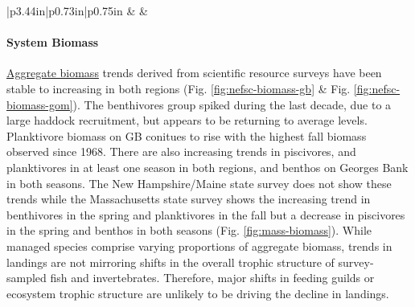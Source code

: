 \documentclass[
  10pt,
]{article}
\begin{document}
\begin{longtable}[c]{|p{3.44in}|p{0.73in}|p{0.75in}}
 &  &  \\




\end{longtable}

\hypertarget{system-biomass}{%
\paragraph{System Biomass}\label{system-biomass}}

\href{https://noaa-edab.github.io/catalog/aggregate-survey-biomass.html}{Aggregate biomass} trends derived from scientific resource surveys have been stable to increasing in both regions (Fig. \ref{fig:nefsc-biomass-gb} \& Fig. \ref{fig:nefsc-biomass-gom}). The benthivores group spiked during the last decade, due to a large haddock recruitment, but appears to be returning to average levels. Planktivore biomass on GB conitues to rise with the highest fall biomass observed since 1968. There are also increasing trends in piscivores, and planktivores in at least one season in both regions, and benthos on Georges Bank in both seasons. The New Hampshire/Maine state survey does not show these trends while the Massachusetts state survey shows the increasing trend in benthivores in the spring and planktivores in the fall but a decrease in piscivores in the spring and benthos in both seasons (Fig. \ref{fig:mass-biomass}). While managed species comprise varying proportions of aggregate biomass, trends in landings are not mirroring shifts in the overall trophic structure of survey-sampled fish and invertebrates. Therefore, major shifts in feeding guilds or ecosystem trophic structure are unlikely to be driving the decline in landings.
\end{document}
